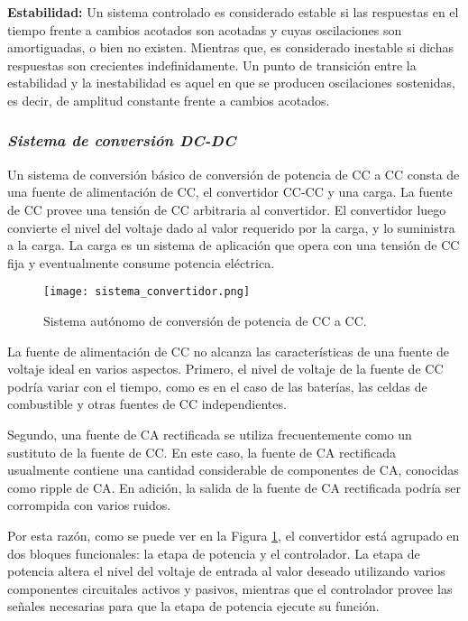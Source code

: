 \textbf{Estabilidad:} Un sistema controlado es considerado estable si las respuestas en el tiempo frente a cambios acotados son acotadas y cuyas oscilaciones son amortiguadas, 
o bien no existen. Mientras que, es considerado inestable si dichas respuestas son crecientes indefinidamente. Un punto de transición entre la estabilidad y la 
inestabilidad es aquel en que se producen oscilaciones sostenidas, es decir, de amplitud constante frente a cambios acotados. \parencite{ADAM}


\subsubsection*{\it{Sistema de conversión DC-DC}}
\vspace{-0.25cm}
Un sistema de conversión básico de conversión de potencia de CC a CC consta de una fuente de alimentación de CC, el convertidor CC-CC y una carga.
La fuente de CC provee una tensión de CC arbitraria al convertidor. El convertidor luego convierte el nivel del voltaje dado al valor requerido
por la carga, y lo suministra a la carga. La carga es un sistema de aplicación que opera con una tensión de CC fija y eventualmente consume potencia
eléctrica.

\begin{figure}[H]
    \centering
    \texttt{[image: sistema\_convertidor.png]}
    \vspace{-0.25cm}
    \caption{Sistema autónomo de conversión de potencia de CC a CC.}
    \label{fig:sistema_convertidor}
\end{figure}
\vspace{-0.5cm}

La fuente de alimentación de CC no alcanza las características de una fuente de voltaje ideal en varios aspectos.
Primero, el nivel de voltaje de la fuente de CC podría variar con el tiempo, como es en el caso de las baterías, las celdas de combustible y otras
fuentes de CC independientes.

Segundo, una fuente de CA rectificada se utiliza frecuentemente como un sustituto de la fuente de CC. En este caso, la fuente de CA rectificada
usualmente contiene una cantidad considerable de componentes de CA, conocidas como ripple de CA. En adición, la salida de la fuente de CA rectificada
podría ser corrompida con varios ruidos.

Por esta razón, como se puede ver en la Figura \ref{fig:sistema_convertidor}, el convertidor está agrupado en dos bloques funcionales: la etapa de potencia
y el controlador. La etapa de potencia altera el nivel del voltaje de entrada al valor deseado utilizando varios componentes circuitales activos y pasivos,
mientras que el controlador provee las señales necesarias para que la etapa de potencia ejecute su función.

